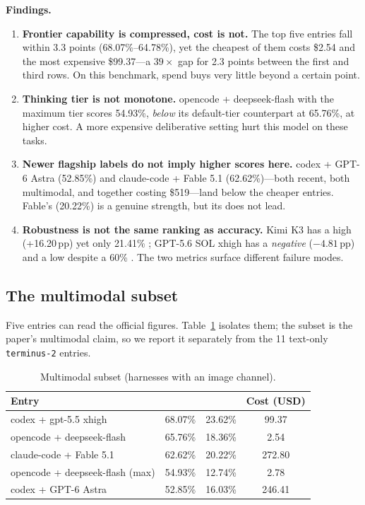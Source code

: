 \textbf{Findings.}
\begin{enumerate}[leftmargin=1.4em,itemsep=2pt]
\item \textbf{Frontier capability is compressed, cost is not.} The top five entries fall within 3.3 \oeval{} points (68.07\%--64.78\%), yet the cheapest of them costs \$2.54 and the most expensive \$99.37---a $39\times$ gap for 2.3 points between the first and third rows. On this benchmark, spend buys very little beyond a certain point.
\item \textbf{Thinking tier is not monotone.} opencode + deepseek-flash with the maximum tier scores 54.93\%, \emph{below} its default-tier counterpart at 65.76\%, at higher cost. A more expensive deliberative setting hurt this model on these tasks.
\item \textbf{Newer flagship labels do not imply higher scores here.} codex + GPT-6 Astra (52.85\%) and claude-code + Fable 5.1 (62.62\%)---both recent, both multimodal, and together costing \$519---land below the cheaper entries. Fable's \roeval{} (20.22\%) is a genuine strength, but its \oeval{} does not lead.
\item \textbf{Robustness is not the same ranking as accuracy.} Kimi K3 has a high \beval{} (+16.20\,pp) yet only 21.41\% \roeval{}; GPT-5.6 SOL xhigh has a \emph{negative} \beval{} ($-4.81$\,pp) and a low \roeval{} despite a 60\% \oeval{}. The two metrics surface different failure modes.
\end{enumerate}

\subsection{The multimodal subset}
Five entries can read the official figures. Table~\ref{tab:mm} isolates them; the subset is the paper's multimodal claim, so we report it separately from the 11 text-only \texttt{terminus-2} entries.

\begin{table}[h]
\centering
\small
\caption{Multimodal subset (harnesses with an image channel).}
\label{tab:mm}
\begin{tabular}{@{}lccc@{}}
\toprule
Entry & \oeval{} & \roeval{} & Cost (USD) \\
\midrule
codex + gpt-5.5 xhigh            & 68.07\% & 23.62\% & 99.37 \\
opencode + deepseek-flash        & 65.76\% & 18.36\% & 2.54 \\
claude-code + Fable 5.1          & 62.62\% & 20.22\% & 272.80 \\
opencode + deepseek-flash (max)  & 54.93\% & 12.74\% & 2.78 \\
codex + GPT-6 Astra              & 52.85\% & 16.03\% & 246.41 \\
\bottomrule
\end{tabular}
\end{table}


